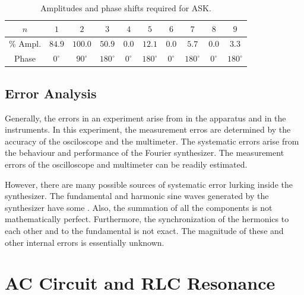 \begin{itemize}[leftmargin = 50pt]
        \begin{table}[H]
            \centering 
            \caption{Amplitudes and phase shifts required for ASK.}
            \begin{tabular}{|c|c|c|c|c|c|c|c|c|c|}
                \hline
                $n$ & $1$ & $2$ & $3$ & $4$ & $5$ & $6$ & $7$ & $8$ & $9$ \\ \hline
                \% Ampl. & $84.9$ & $100.0 $& $50.9$ & $0.0$ & $12.1$ & $0.0$ & $5.7$ & $0.0$ & $3.3$ \\ 
                Phase & $0^{\circ}$ & $90^{\circ}$ & $180^{\circ}$ & $0^{\circ}$ & $180^{\circ}$ & $0^{\circ}$ & $180^{\circ}$ & $0^{\circ}$ & $180^{\circ}$ \\ \hline
            \end{tabular}
            \label{tab:FS8}
        \end{table}
\end{itemize}

\section{Error Analysis}

Generally, the errors in an experiment arise from  in the apparatus and  in the instruments. In this experiment, the measurement erros are determined by the accuracy of the osciloscope and the multimeter. The systematic errors arise from the behaviour and performance of the Fourier synthesizer. The measurement errors of the oscilloscope and multimeter can be readily estimated.

However, there are many possible sources of systematic error lurking inside the synthesizer. The fundamental and harmonic sine waves generated by the synthesizer have some . Also, the summation of all the components is not mathematically perfect. Furthermore, the synchronization of the hermonics to each other and to the fundamental is not exact. The magnitude of these and other internal errors is essentially unknown. 



\chapter{AC Circuit and RLC Resonance}


